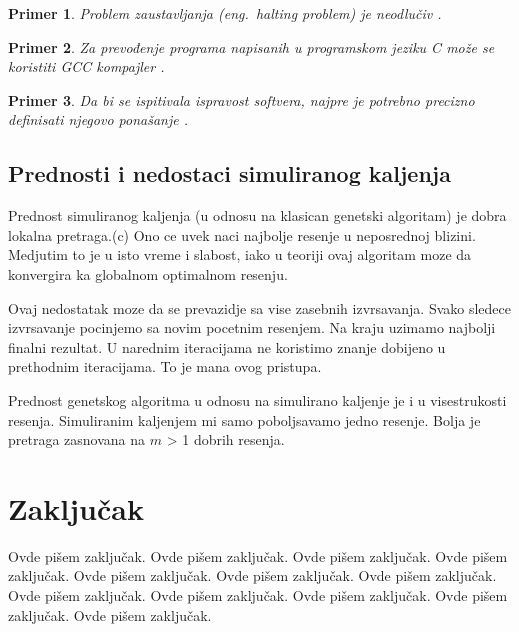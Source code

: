 \documentclass[a4paper]{article}
\newtheorem{primer}{Primer}[section]
\begin{document}
\begin{primer}
Problem zaustavljanja (eng.~{\em halting problem}) je neodlučiv \cite{haltingproblem}.
\end{primer}

\begin{primer}
Za prevođenje programa napisanih u programskom jeziku C može se koristiti GCC kompajler \cite{gcc}.
\end{primer}

\begin{primer}
 Da bi se ispitivala ispravost softvera, najpre je potrebno precizno definisati njegovo ponašanje \cite{laski2009software}. 
\end{primer}

\subsection{Prednosti i nedostaci simuliranog kaljenja}

Prednost simuliranog kaljenja (u odnosu na klasican genetski algoritam) je dobra lokalna pretraga.(c) Ono ce uvek naci najbolje resenje u neposrednoj blizini. Medjutim to je u isto vreme i slabost, iako u teoriji ovaj algoritam moze da konvergira ka globalnom optimalnom resenju. \par
Ovaj nedostatak moze da se prevazidje sa vise zasebnih izvrsavanja. Svako sledece izvrsavanje pocinjemo sa novim pocetnim resenjem. Na kraju uzimamo najbolji finalni rezultat. U narednim iteracijama ne koristimo znanje dobijeno u prethodnim iteracijama. To je mana ovog pristupa. \par
Prednost genetskog algoritma u odnosu na simulirano kaljenje je i u visestrukosti resenja. Simuliranim kaljenjem mi samo poboljsavamo jedno resenje. Bolja je pretraga zasnovana na $m$ > 1 dobrih resenja.

\section{Zaključak}
\label{sec:zakljucak}

Ovde pišem zaključak. 
Ovde pišem zaključak. 
Ovde pišem zaključak. 
Ovde pišem zaključak. 
Ovde pišem zaključak. 
Ovde pišem zaključak. 
Ovde pišem zaključak. 
Ovde pišem zaključak. 
Ovde pišem zaključak. 
Ovde pišem zaključak. 
Ovde pišem zaključak. 
Ovde pišem zaključak. 


\appendix
 


\appendix
\end{document}

